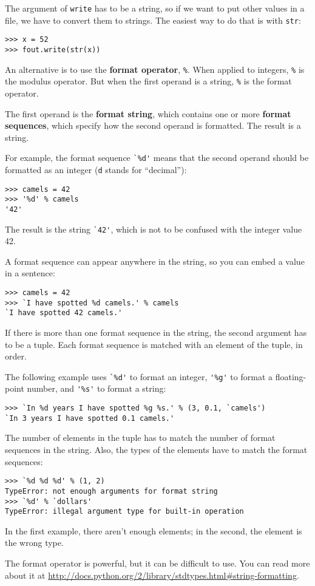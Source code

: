 \documentclass{article}
\begin{document}
The argument of \verb|write| has to be a string, so if we want to put other
values in a file, we have to convert them to strings. The easiest way
to do that is with \verb|str|:
\begin{verbatim}
>>> x = 52
>>> fout.write(str(x))
\end{verbatim}
An alternative is to use the \textbf{format operator}, \verb|%|.
When applied to integers, \verb|%| is the modulus operator.
But when the first operand is a string, \verb|%| is the format operator.
\par The first operand is the \textbf{format string},
which contains one or more
\textbf{format sequences}, which specify how the second operand is formatted.
The result is a string.
\par For example, the format sequence \verb|`%d'| means that the second operand
should be formatted as an integer (\verb|d| stands for ``decimal''):
\begin{verbatim}
>>> camels = 42
>>> '%d' % camels
'42'
\end{verbatim}
\par The result is the string \verb|`42'|,
which is not to be confused with the integer value 42.
\par A format sequence can appear anywhere in the string, so you can embed
a value in a sentence:
\begin{verbatim}
>>> camels = 42
>>> `I have spotted %d camels.' % camels
`I have spotted 42 camels.'
\end{verbatim}
\par If there is more than one format sequence in the string, the second
argument has to be a tuple. Each format sequence is matched with an
element of the tuple, in order.
\par The following example uses \verb|`%d'| to format an integer,
\verb|'%g'| to format a
floating-point number, and \verb|'%s'| to format a string:
\begin{verbatim}
>>> `In %d years I have spotted %g %s.' % (3, 0.1, `camels')
`In 3 years I have spotted 0.1 camels.'
\end{verbatim}
\par The number of elements in the tuple has to match the number of format
sequences in the string. Also, the types of the elements have to match
the format sequences:
\begin{verbatim}
>>> `%d %d %d' % (1, 2)
TypeError: not enough arguments for format string
>>> `%d' % `dollars'
TypeError: illegal argument type for built-in operation
\end{verbatim}
\par In the first example, there aren't enough elements; in the second,
the element is the wrong type.
\par The format operator is powerful, but it can be difficult to use. You
can read more about it at
\url{http://docs.python.org/2/library/stdtypes.html#string-formatting}.
\end{document}
